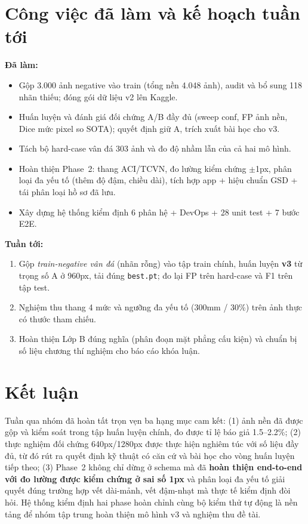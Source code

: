 \documentclass[12pt,a4paper]{article}
\begin{document}
\section{Công việc đã làm và kế hoạch tuần tới}
\textbf{Đã làm:}
\begin{itemize}[leftmargin=*]
    \item Gộp 3.000 ảnh negative vào train (tổng nền 4.048 ảnh), audit và bổ sung 118 nhãn thiếu; đóng gói dữ liệu v2 lên Kaggle.
    \item Huấn luyện và đánh giá đối chứng A/B đầy đủ (sweep conf, FP ảnh nền, Dice mức pixel so SOTA); quyết định giữ A, trích xuất bài học cho v3.
    \item Tách bộ hard-case vân đá 303 ảnh và đo độ nhầm lẫn của cả hai mô hình.
    \item Hoàn thiện Phase~2: thang ACI/TCVN, đo lường kiểm chứng $\pm$1px, phân loại đa yếu tố (thêm độ đậm, chiều dài), tích hợp app + hiệu chuẩn GSD + tái phân loại hồ sơ đã lưu.
    \item Xây dựng hệ thống kiểm định 6 phân hệ + DevOps + 28 unit test + 7 bước E2E.
\end{itemize}
\textbf{Tuần tới:}
\begin{enumerate}[leftmargin=*]
    \item Gộp \emph{train-negative vân đá} (nhãn rỗng) vào tập train chính, huấn luyện \textbf{v3} từ trọng số A ở 960px, tải đúng \texttt{best.pt}; đo lại FP trên hard-case và F1 trên tập test.
    \item Nghiệm thu thang 4 mức và ngưỡng đa yếu tố (300mm / 30\%) trên ảnh thực có thước tham chiếu.
    \item Hoàn thiện Lớp B đúng nghĩa (phân đoạn mặt phẳng cấu kiện) và chuẩn bị số liệu chương thí nghiệm cho báo cáo khóa luận.
\end{enumerate}

\section{Kết luận}
Tuần qua nhóm đã hoàn tất trọn vẹn ba hạng mục cam kết: (1) ảnh nền đã được gộp và kiểm soát trong tập huấn luyện chính, đo được tỉ lệ báo giả 1.5--2.2\%; (2) thực nghiệm đối chứng 640px/1280px được thực hiện nghiêm túc với số liệu đầy đủ, từ đó rút ra quyết định kỹ thuật có căn cứ và bài học cho vòng huấn luyện tiếp theo; (3) Phase~2 không chỉ dừng ở schema mà đã \textbf{hoàn thiện end-to-end với đo lường được kiểm chứng ở sai số 1px} và phân loại đa yếu tố giải quyết đúng trường hợp vết dài-mảnh, vết đậm-nhạt mà thực tế kiểm định đòi hỏi. Hệ thống kiểm định hai phase hoàn chỉnh cùng bộ kiểm thử tự động là nền tảng để nhóm tập trung hoàn thiện mô hình v3 và nghiệm thu đề tài.
\end{document}
